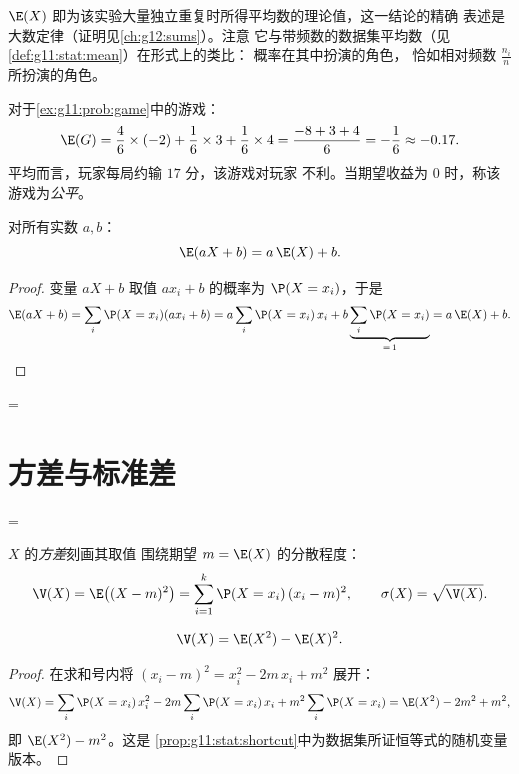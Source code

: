\begin{remark}
$\E(X)$ 即为该实验大量独立重复时所得平均数的理论值，这一结论的精确
表述是大数定律（证明见\cref{ch:g12:sums}）。注意
它与带频数的数据集平均数（见\cref{def:g11:stat:mean}）在形式上的类比：
概率在其中扮演的角色，
恰如相对频数
$\frac{n_i}{n}$ 所扮演的角色。
\end{remark}

\begin{example}\label{ex:g11:prob:gameexp}
对于\cref{ex:g11:prob:game}中的游戏：
\[
\E(G) = \frac46 \times (-2) + \frac16 \times 3 + \frac16 \times 4
= \frac{-8 + 3 + 4}{6} = -\frac16 \approx -0.17 .
\]
平均而言，玩家每局约输 $17$ 分，该游戏对玩家
不利。当期望收益为 $0$ 时，称该游戏为\emph{公平}。
\end{example}

\begin{proposition}[线性性]\label{prop:g11:prob:linearity}
对所有实数 $a, b$：
\[
\E(aX + b) = a\,\E(X) + b .
\]
\end{proposition}

\begin{proof}
变量 $aX + b$ 取值 $a x_i + b$ 的概率为
$\P(X = x_i)$，于是
\[
\E(aX + b) = \sum_i \P(X = x_i)(a x_i + b)
= a \sum_i \P(X = x_i)\,x_i + b \underbrace{\sum_i \P(X =
x_i)}_{=\,1} = a\,\E(X) + b .
\]
\end{proof}

=\section{方差与标准差}

=\begin{definition}[方差]\label{def:g11:prob:variance}
$X$ 的\emph{方差}刻画其取值
围绕期望 $m = \E(X)$ 的分散程度：
\[
\V(X) = \E\bigl((X - m)^2\bigr)
= \sum_{i=1}^{k} \P(X = x_i)\,(x_i - m)^2,
\qquad
\sigma(X) = \sqrt{\V(X)} .
\]
\end{definition}

\begin{proposition}[简便公式]\label{prop:g11:prob:konig}
\[
\V(X) = \E(X^2) - \E(X)^2 .
\]
\end{proposition}

\begin{proof}
在求和号内将 $(x_i - m)^2 = x_i^2 - 2m\,x_i + m^2$ 展开：
\[
\V(X) = \sum_i \P(X = x_i)\,x_i^2
- 2m \sum_i \P(X = x_i)\,x_i + m^2\sum_i \P(X = x_i)
= \E(X^2) - 2m^2 + m^2 ,
\]
即 $\E(X^2) - m^2$。这是
\cref{prop:g11:stat:shortcut}中为数据集所证恒等式的随机变量版本。
\end{proof}

